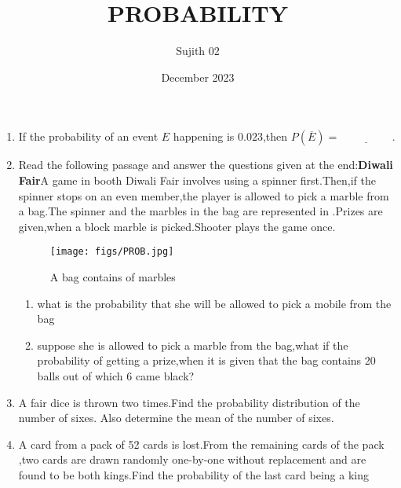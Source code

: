 \documentclass[12pt,-letter paper]{article}
\begin{document}
\title{PROBABILITY}
\author{Sujith 02}
\date{December 2023}
\maketitle
  \begin{enumerate}
	  \item If the probability of an event $E$ happening is $0.023$,then $P(\overline{E})=\underline{\hspace{2cm}}$.


	  \item Read the following passage and answer the questions given at the end:\newline\textbf{Diwali Fair}\newline A game in booth Diwali Fair involves using a spinner first.Then,if the spinner stops on an even member,the player is allowed to pick a marble from a bag.The spinner and the marbles in the bag are represented in .\newline Prizes are given,when a block marble is picked.Shooter plays the game once.
  
		\begin{figure}[H]
			\centering
			\texttt{[image: figs/PROB.jpg]}
			\caption{A bag contains of marbles}
			\label{fig:PROB.jpg}
  \end{figure}
\begin{enumerate}[label=(\roman*)]
 \item what is the probability that she will be allowed to pick a mobile from the bag
  \item suppose she is allowed to pick a marble from the bag,what if the probability of getting a prize,when it is given that the bag contains 20 balls out of which 6 came black?
\end{enumerate}
 \item A fair dice is thrown two times.Find the 
probability distribution of the number of sixes. 
Also determine the mean of the number of sixes.
 \item A card from a pack of 52 cards is lost.From the remaining cards of the pack ,two cards are drawn randomly one-by-one without replacement and are found to be both kings.Find the probability of the last card being a king
\end{enumerate}
\end{document}
